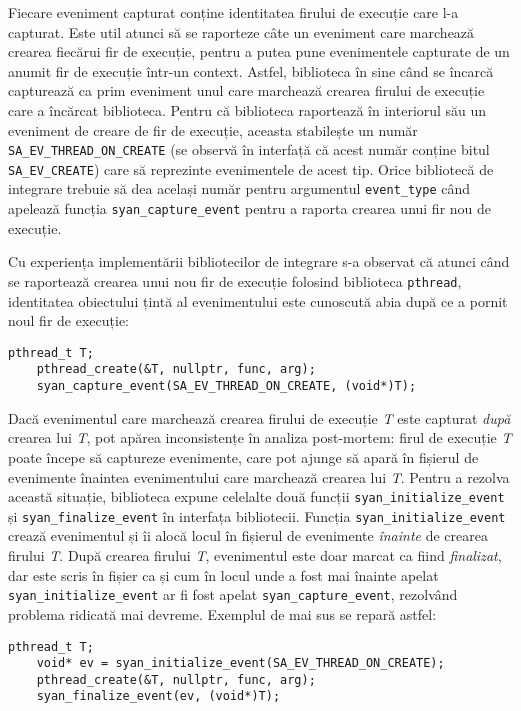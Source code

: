Fiecare eveniment capturat conține identitatea firului de execuție care
l-a capturat. Este util atunci să se raporteze câte un eveniment care
marchează crearea fiecărui fir de execuție, pentru a putea pune
evenimentele capturate de un anumit fir de execuție într-un context.
Astfel, biblioteca în sine când se încarcă capturează ca prim eveniment
unul care marchează crearea firului de execuție care a încărcat
biblioteca. Pentru că biblioteca raportează în interiorul său un
eveniment de creare de fir de execuție, aceasta stabilește un număr
\lstinline{SA_EV_THREAD_ON_CREATE} (se observă în interfață că acest
număr conține bitul \lstinline{SA_EV_CREATE}) care să reprezinte
evenimentele de acest tip. Orice bibliotecă de integrare trebuie să dea
același număr pentru argumentul \lstinline{event_type} când apelează
funcția \lstinline{syan_capture_event} pentru a raporta crearea unui fir
nou de execuție.

Cu experiența implementării bibliotecilor de integrare s-a observat că
atunci când se raportează crearea unui nou fir de execuție folosind
biblioteca \lstinline{pthread}, identitatea obiectului țintă
al evenimentului este cunoscută abia după ce a pornit noul fir de
execuție:
\begin{lstlisting}[caption=Capturare incorectă a creării unui fir de
                           execuție]
    pthread_t T;
    pthread_create(&T, nullptr, func, arg);
    syan_capture_event(SA_EV_THREAD_ON_CREATE, (void*)T);
\end{lstlisting}
Dacă evenimentul care marchează crearea firului de execuție \textit{T}
este capturat \textit{după} crearea lui \textit{T}, pot apărea
inconsistențe în analiza post-mortem: firul de execuție \textit{T} poate
începe să captureze evenimente, care pot ajunge să apară în fișierul de
evenimente înaintea evenimentului care marchează crearea lui \textit{T}.
Pentru a rezolva această situație, biblioteca expune celelalte două
funcții \lstinline{syan_initialize_event} și
\lstinline{syan_finalize_event} în interfața bibliotecii.  Funcția
\lstinline{syan_initialize_event} crează evenimentul și îi alocă locul
în fișierul de evenimente \textit{înainte} de crearea firului
\textit{T}. După crearea firului \textit{T}, evenimentul este doar
marcat ca fiind \textit{finalizat}, dar este scris în fișier ca și cum
în locul unde a fost mai înainte apelat
\lstinline{syan_initialize_event} ar fi fost apelat
\lstinline{syan_capture_event}, rezolvând problema ridicată mai devreme.
Exemplul de mai sus se repară astfel:
\begin{lstlisting}[caption=Capturare corectă a creării unui fir de
                           execuție]
    pthread_t T;
    void* ev = syan_initialize_event(SA_EV_THREAD_ON_CREATE);
    pthread_create(&T, nullptr, func, arg);
    syan_finalize_event(ev, (void*)T);
\end{lstlisting}

